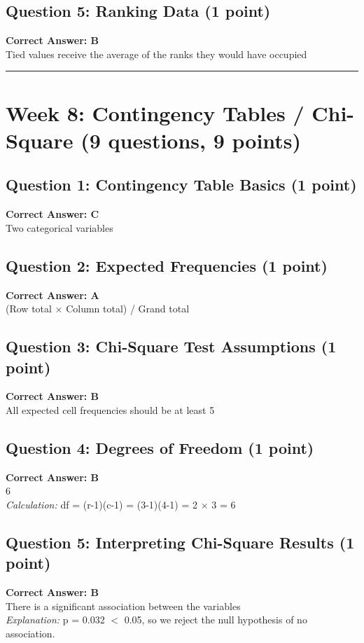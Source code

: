 \documentclass[10pt]{article}
\begin{document}
\subsection*{Question 5: Ranking Data (1 point)}
\textbf{Correct Answer: \textcolor{correctcolor}{B}}\\
Tied values receive the average of the ranks they would have occupied

\vspace{10pt}

\noindent\rule{\textwidth}{0.4pt}

\section*{Week 8: Contingency Tables / Chi-Square (9 questions, 9 points)}

\subsection*{Question 1: Contingency Table Basics (1 point)}
\textbf{Correct Answer: \textcolor{correctcolor}{C}}\\
Two categorical variables

\subsection*{Question 2: Expected Frequencies (1 point)}
\textbf{Correct Answer: \textcolor{correctcolor}{A}}\\
(Row total × Column total) / Grand total

\subsection*{Question 3: Chi-Square Test Assumptions (1 point)}
\textbf{Correct Answer: \textcolor{correctcolor}{B}}\\
All expected cell frequencies should be at least 5

\subsection*{Question 4: Degrees of Freedom (1 point)}
\textbf{Correct Answer: \textcolor{correctcolor}{B}}\\
6\\
\textit{Calculation:} df = (r-1)(c-1) = (3-1)(4-1) = 2 × 3 = 6

\subsection*{Question 5: Interpreting Chi-Square Results (1 point)}
\textbf{Correct Answer: \textcolor{correctcolor}{B}}\\
There is a significant association between the variables\\
\textit{Explanation:} p = 0.032 $<$ 0.05, so we reject the null hypothesis of no association.
\end{document}
